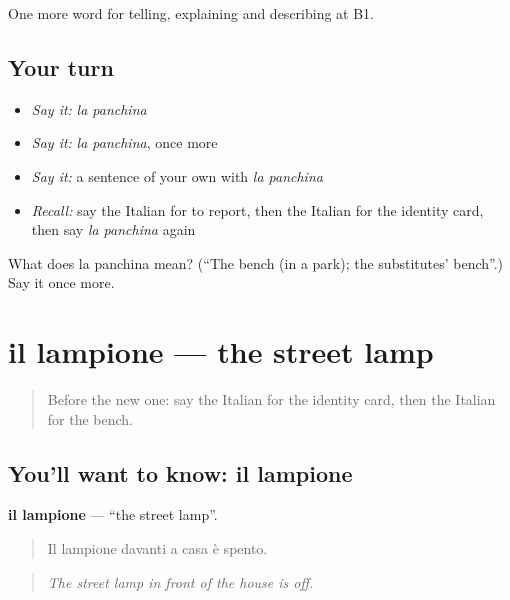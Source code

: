 \begin{grammarlens}[title={What you've built}]
One more word for telling, explaining and describing at B1.
\end{grammarlens}

\subsection*{Your turn}
\begin{itemize}
\raggedright
  \item \emph{Say it:} \emph{la panchina}
  \item \emph{Say it:} \emph{la panchina}, once more
  \item \emph{Say it:} a sentence of your own with \emph{la panchina}
  \item \emph{Recall:} say the Italian for to report, then the Italian for the identity card, then say \emph{la panchina} again
\end{itemize}

\begin{tcolorbox}[breakable,colback=teal!4,colframe=teal!35!black,title={Before you move on}]
What does la panchina mean? (\textquotedblleft{}The bench (in a park); the substitutes' bench\textquotedblright{}.) Say it once more.
\end{tcolorbox}
\section[il lampione]{il lampione — the street lamp}

\label{lesson:IT-C448-lampione}



\begin{quote}
Before the new one: say the Italian for the identity card, then the Italian for the bench.
\end{quote}

\subsection*{You'll want to know: il lampione}
\textbf{il lampione} — \textquotedblleft{}the street lamp\textquotedblright{}.

\begin{quote}
Il lampione davanti a casa è spento.
\end{quote}

\begin{quote}
\emph{The street lamp in front of the house is off.}
\end{quote}

